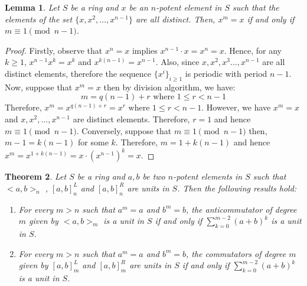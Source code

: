 \documentclass[12pt]{amsart}
\newtheorem{theorem}{Theorem}[section]
\newtheorem{lem}[theorem]{Lemma}
\theoremstyle{definition}
\numberwithin{equation}{section}
\begin{document}
\begin{lem}\label{LEM: when is x^k=x?}
    Let $S$ be a ring and $x$ be an $n$-potent element in $S$ such that the elements of the set  $ \{x,x^2,\dots,x^{n-1}\}$ are all distinct. Then, $x^{m}=x$ if and only if $m \equiv 1 \pmod{n-1}$.
\end{lem}
\begin{proof}
Firstly, observe that $x^n=x$ implies $x^{n-1}\cdot x=x^n=x$. Hence, for any $k \geq 1$, $x^{n-1}x^k=x^k$ and $x^{k({n-1})}=x^{n-1}$. Also, since $x,x^2,x^3\dots,x^{n-1}$ are all distinct elements, therefore the sequence $\{x^i\}_{i \geq 1}$ is periodic with period $n-1$. Now, suppose that $x^m=x$ then by division algorithm, we have: $$m=q(n-1)+r \text{ where } 1 \leq r<n-1$$
Therefore, $x^{m}=x^{q(n-1)+r}=x^{r} \text{ where } 1 \leq r<n-1.$ However, we have $x^m=x$ and $x,x^2,\dots,x^{n-1}$ are distinct elements. Therefore, $r=1$ and hence $m \equiv 1 \pmod{n-1}$. Conversely, suppose that $m \equiv 1 \pmod{n-1}$ then, $m -1=k(n-1)$ for some $k$. Therefore, $m=1+k(n-1)$ and hence $x^m=x^{1+k(n-1)}=x\cdot(x^{n-1})^k=x.$

\end{proof}
\begin{theorem}\label{THM: Higher vs Lower}
    Let $S$ be a ring and $a,b$ be two $n$-potent elements in $S$ such that $<a,b>_n$ , $[a,b]_n^L$ and $[a,b]_n^R$ are units in $S$. Then the following results hold:
    \begin{enumerate}
        \item For every $m >n$ such that $a^m=a$ and $b^m=b$, the anticommutator of degree $m$ given by $<a,b>_m$ is a unit in $S$ if and only if $\displaystyle\sum_{k=0}^{m-2}(a+b)^k$ is a unit in $S$.
        \item For every $m >n$ such that $a^m=a$ and $b^m=b$, the commutators of degree $m$ given by $[a,b]_m^L$ and $[a,b]_m^R$ are units in $S$ if and only if $\displaystyle\sum_{k=0}^{m-2}(a+b)^k$ is a unit in $S$. 
    \end{enumerate}
    
\end{theorem}
\end{document}
